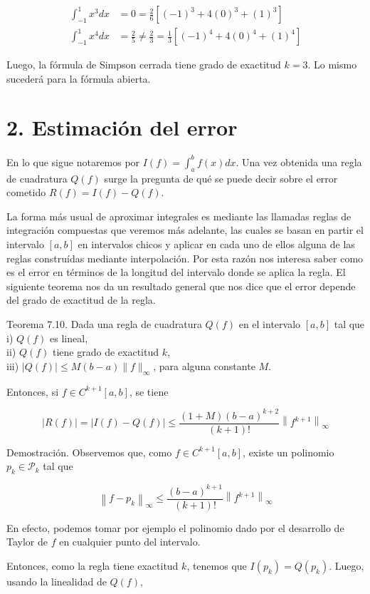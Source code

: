 \documentclass[10pt]{article}
\begin{document}
$$
\begin{aligned}
\int_{-1}^{1} x^{3} d x & =0=\frac{2}{6}\left[(-1)^{3}+4(0)^{3}+(1)^{3}\right] \\
\int_{-1}^{1} x^{4} d x & =\frac{2}{5} \neq \frac{2}{3}=\frac{1}{3}\left[(-1)^{4}+4(0)^{4}+(1)^{4}\right]
\end{aligned}
$$

Luego, la fórmula de Simpson cerrada tiene grado de exactitud $k=3$. Lo mismo sucederá para la fórmula abierta.

\section*{2. Estimación del error}
En lo que sigue notaremos por $I(f)=\int_{a}^{b} f(x) d x$. Una vez obtenida una regla de cuadratura $Q(f)$ surge la pregunta de qué se puede decir sobre el error cometido $R(f)=I(f)-Q(f)$.

La forma más usual de aproximar integrales es mediante las llamadas reglas de integración compuestas que veremos más adelante, las cuales se basan en partir el intervalo $[a, b]$ en intervalos chicos y aplicar en cada uno de ellos alguna de las reglas construídas mediante interpolación. Por esta razón nos interesa saber como es el error en términos de la longitud del intervalo donde se aplica la regla. El siguiente teorema nos da un resultado general que nos dice que el error depende del grado de exactitud de la regla.

Teorema 7.10. Dada una regla de cuadratura $Q(f)$ en el intervalo $[a, b]$ tal que\\
i) $Q(f)$ es lineal,\\
ii) $Q(f)$ tiene grado de exactitud $k$,\\
iii) $|Q(f)| \leq M(b-a)\|f\|_{\infty}$, para alguna constante $M$.

Entonces, si $f \in C^{k+1}[a, b]$, se tiene

$$
|R(f)|=|I(f)-Q(f)| \leq \frac{(1+M)(b-a)^{k+2}}{(k+1)!}\left\|f^{k+1}\right\|_{\infty}
$$

Demostración. Observemos que, como $f \in C^{k+1}[a, b]$, existe un polinomio $p_{k} \in \mathcal{P}_{k}$ tal que

$$
\left\|f-p_{k}\right\|_{\infty} \leq \frac{(b-a)^{k+1}}{(k+1)!}\left\|f^{k+1}\right\|_{\infty}
$$

En efecto, podemos tomar por ejemplo el polinomio dado por el desarrollo de Taylor de $f$ en cualquier punto del intervalo.

Entonces, como la regla tiene exactitud $k$, tenemos que $I\left(p_{k}\right)=Q\left(p_{k}\right)$. Luego, usando la linealidad de $Q(f)$,
\end{document}
